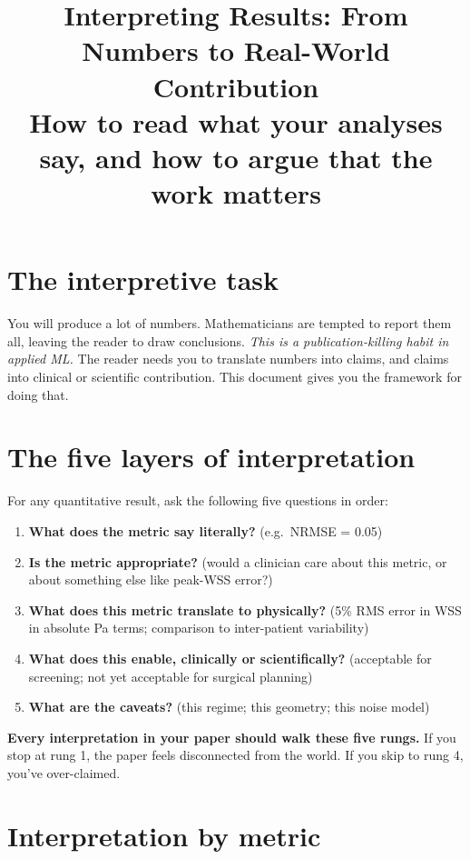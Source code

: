 \documentclass[11pt]{article}
\title{\bfseries Interpreting Results: From Numbers to Real-World Contribution\\[0.3em]
\large How to read what your analyses say, and how to argue that the work matters}
\author{}
\date{}
\begin{document}
\maketitle

\section*{The interpretive task}
You will produce a lot of numbers. Mathematicians are tempted to report them all, leaving the reader to draw conclusions. \emph{This is a publication-killing habit in applied ML.} The reader needs you to translate numbers into claims, and claims into clinical or scientific contribution. This document gives you the framework for doing that.

\section{The five layers of interpretation}

For any quantitative result, ask the following five questions in order:

\begin{enumerate}
\item \textbf{What does the metric say literally?} (e.g.\ NRMSE = 0.05)
\item \textbf{Is the metric appropriate?} (would a clinician care about this metric, or about something else like peak-WSS error?)
\item \textbf{What does this metric translate to physically?} (5\% RMS error in WSS in absolute Pa terms; comparison to inter-patient variability)
\item \textbf{What does this enable, clinically or scientifically?} (acceptable for screening; not yet acceptable for surgical planning)
\item \textbf{What are the caveats?} (this regime; this geometry; this noise model)
\end{enumerate}

\textbf{Every interpretation in your paper should walk these five rungs.} If you stop at rung 1, the paper feels disconnected from the world. If you skip to rung 4, you've over-claimed.

\section{Interpretation by metric}
\end{document}
